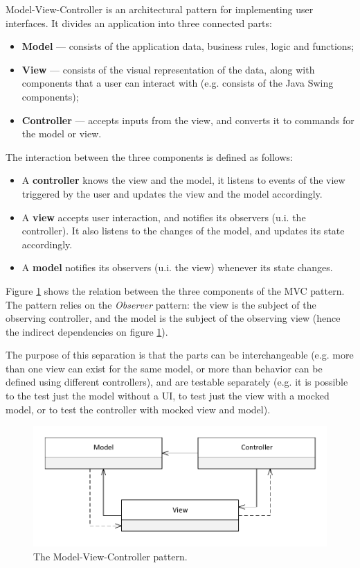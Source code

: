 Model-View-Controller is an architectural pattern for implementing user interfaces\cite{krasner_description_1988}. It divides an application into three connected parts:
\begin{itemize}
\item \textbf{Model} --- consists of the application data, business rules, logic and functions;
\item \textbf{View} --- consists of the visual representation of the data, along with components that a user can interact with (e.g. consists of the Java Swing components);
\item \textbf{Controller} --- accepts inputs from the view, and converts it to commands for the model or view.
\end{itemize}

The interaction between the three components is defined as follows:
\begin{itemize}
\item A \textbf{controller} knows the view and the model, it listens to events of the view triggered by the user and updates the view and the model accordingly.
\item A \textbf{view} accepts user interaction, and notifies its observers (u.i. the controller). It also listens to the changes of the model, and updates its state accordingly.
\item A \textbf{model} notifies its observers (u.i. the view) whenever its state changes.
\end{itemize}

Figure \ref{fig:mvc_pattern} shows the relation between the three components of the MVC pattern. The pattern relies on the \emph{Observer} pattern: the view is the subject of the observing controller, and the model is the subject of the observing view (hence the indirect dependencies on figure \ref{fig:mvc_pattern}).

The purpose of this separation is that the parts can be interchangeable (e.g. more than one view can exist for the same model, or more than behavior can be defined using different controllers), and are testable separately (e.g. it is possible to the test just the model without a UI, to test just the view with a mocked model, or to test the controller with mocked view and model).

\begin{figure}[h!]
\centering
  \includegraphics[width=1\textwidth]{images/mvc-design-pattern.pdf}
\caption{The Model-View-Controller pattern.}
\label{fig:mvc_pattern}
\end{figure}


